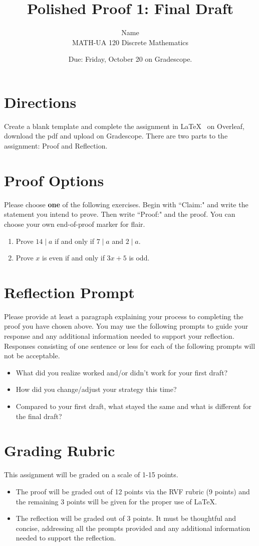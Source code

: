 \documentclass{article}
\title{Polished Proof 1: Final Draft}
\author{%
	Name
	\\
	MATH-UA 120 Discrete Mathematics
}
\date{Due: Friday, October 20 on Gradescope.}
\theoremstyle{definition}
\begin{document}
    \maketitle
	
\section*{Directions}
    Create a blank template and complete the assignment in \LaTeX~  on Overleaf, 
    download the pdf and upload on Gradescope. There are two parts to the assignment: Proof and Reflection.

\section*{Proof Options}
    Please choose \textbf{one} of the following exercises. Begin with ``Claim:" and write the statement you intend to prove. 
    Then write ``Proof:" and the proof. You can choose your own end-of-proof marker for flair.
    \begin{enumerate}
	\item Prove $14 \mid a$ if and only if $7 \mid a$ and $2\mid a$.
	\item Prove $x$ is even if and only if $3x+5$ is odd.
    \end{enumerate}

\section*{Reflection Prompt}
    Please provide at least a paragraph explaining your process to completing the proof you have chosen above. You may use the following prompts to guide your response and any additional information needed to support your reflection. Responses consisting of one sentence or less for each of the following prompts will not be acceptable.
    \begin{itemize}
        \item What did you realize worked and/or didn't work for your first draft?
        \item How did you change/adjust your strategy this time?
        \item Compared to your first draft, what stayed the same and what is different for the final draft?
    \end{itemize}

\section*{Grading Rubric}
    This assignment will be graded on a scale of 1-15 points.
    \begin{itemize}
    \item The proof will be graded out of 12 points via the RVF rubric (9 points) and the remaining 3 points will be given for the proper use of \LaTeX.
    \item The reflection will be graded out of 3 points. It must be thoughtful and concise, addressing all the prompts provided and any additional information needed to support the reflection.
    \end{itemize}
     
\end{document}
